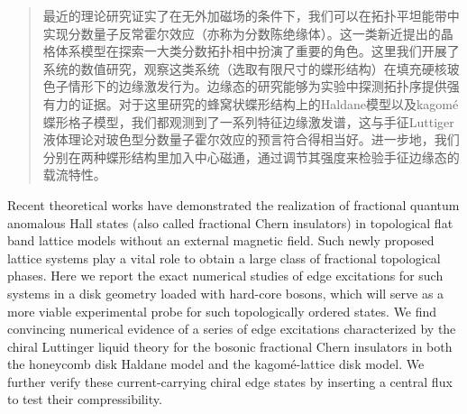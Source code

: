 \begin{abstract}
最近的理论研究证实了在无外加磁场的条件下，我们可以在拓扑平坦能带中实现分数量子反常霍尔效应（亦称为分数陈绝缘体）。这一类新近提出的晶格体系模型在探索一大类分数拓扑相中扮演了重要的角色。这里我们开展了系统的数值研究，观察这类系统（选取有限尺寸的蝶形结构）在填充硬核玻色子情形下的边缘激发行为。边缘态的研究能够为实验中探测拓扑序提供强有力的证据。对于这里研究的蜂窝状蝶形结构上的Haldane模型以及kagom\'{e} 蝶形格子模型，我们都观测到了一系列特征边缘激发谱，这与手征Luttiger液体理论对玻色型分数量子霍尔效应的预言符合得相当好。进一步地，我们分别在两种蝶形结构里加入中心磁通，通过调节其强度来检验手征边缘态的载流特性。

\end{abstract}


\begin{englishabstract}
Recent theoretical works have demonstrated the realization of fractional quantum anomalous Hall states (also called fractional Chern insulators) in topological flat band lattice models without an external magnetic field. Such newly proposed lattice systems play a vital role to obtain a large class of fractional topological phases. Here we report the exact numerical studies of edge excitations for such systems in a disk geometry loaded with hard-core bosons, which will serve as a more viable experimental probe for such topologically ordered states. We find convincing numerical evidence of a series of edge excitations characterized by the chiral Luttinger liquid theory for the bosonic fractional Chern insulators in both the honeycomb disk Haldane model and the kagom\'{e}-lattice disk model. We further verify these current-carrying chiral edge states by inserting a central flux to test their compressibility.

\end{englishabstract}
